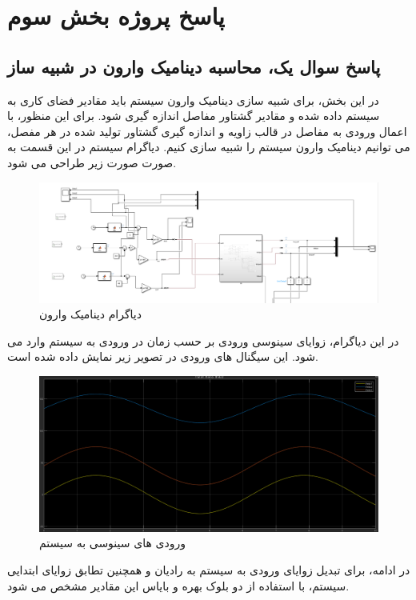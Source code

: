 
\chapter*{پاسخ پروژه بخش سوم}
\section*{ پاسخ سوال یک، محاسبه دینامیک وارون در شبیه ساز}

در این بخش، برای شبیه سازی دینامیک وارون سیستم باید مقادیر فضای کاری به سیستم داده شده و مقادیر گشتاور مفاصل اندازه گیری شود. برای این منظور، با اعمال ورودی به مفاصل در قالب زاویه و اندازه گیری گشتاور تولید شده در هر مفصل، می توانیم دینامیک وارون سیستم را شبیه سازی کنیم. دیاگرام سیستم در این قسمت به صورت صورت زیر طراحی می شود.
\begin{figure}[H]
	\centering
	\includegraphics[width=1\linewidth]{../img/1}
	\caption{دیاگرام دینامیک وارون}
	\label{fig:1}
\end{figure}
در این دیاگرام، زوایای سینوسی ورودی بر حسب زمان در ورودی به سیستم وارد می شود. این سیگنال های ورودی در تصویر زیر نمایش داده شده است.
\begin{figure}[H]
	\centering
	\includegraphics[width=1\linewidth]{../img/2}
	\caption{ورودی های سینوسی به سیستم}
	\label{fig:2}
\end{figure}
در ادامه، برای تبدیل زوایای ورودی به سیستم به رادیان و همچنین تطابق زوایای ابتدایی سیستم، با استفاده از دو بلوک بهره و بایاس این مقادیر مشخص می شود. 
